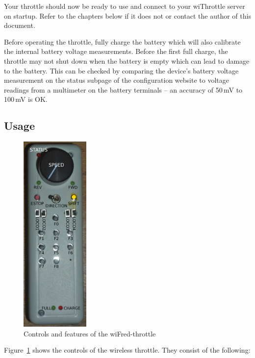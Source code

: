 \documentclass[11pt,a4paper]{scrartcl}
\begin{document}
Your throttle should now be ready to use and connect to your wiThrottle server on startup. Refer to the chapters below if it does not or contact the author of this document.

Before operating the throttle, fully charge the battery which will also calibrate the internal battery voltage measurements. Before the first full charge, the throttle may not shut down when the battery is empty which can lead to damage to the battery. This can be checked by comparing the device's battery voltage measurement on the status subpage of the configuration website to voltage readings from a multimeter on the battery terminals -- an accuracy of 50\,mV to 100\,mV is OK.

\subsection{Usage}

\begin{figure}[tbh]
  \centering
  \includegraphics[height=100mm]{images/_DSC0136}
  \caption{Controls and features of the wiFred-throttle}
  \label{throttleControls}
\end{figure}

Figure~\ref{throttleControls} shows the controls of the wireless throttle. They consist of the following:
\end{document}
